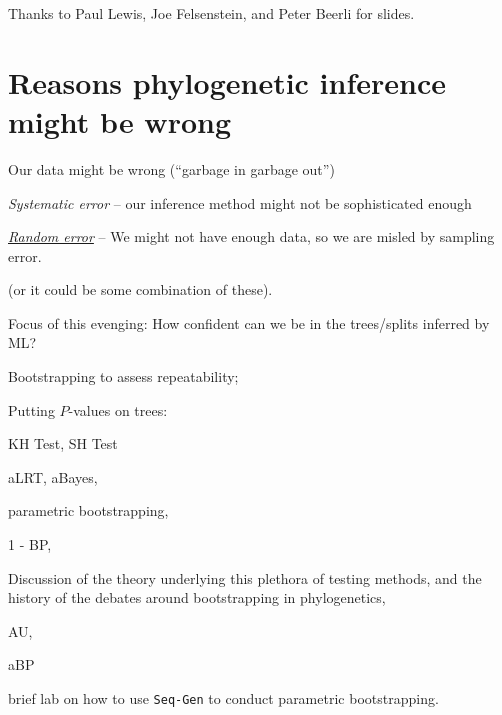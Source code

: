 \documentclass[landscape]{foils}
\begin{document}
\myNewSlide
\huge 
Thanks to Paul Lewis, Joe Felsenstein, and Peter Beerli for slides.

\myNewSlide
\section*{Reasons phylogenetic inference might be wrong}
\Large
\begin{compactenum}
	\item Our data might be wrong (``garbage in garbage out'')
	\item {\em Systematic error} -- our inference method might not be sophisticated enough
	\item \underline{{\em Random error}} -- We might not have enough data, so we are misled by sampling error.
\end{compactenum}

(or it could be some combination of these).

{Focus of this evenging: How confident can we be in the trees/splits inferred by ML?}

\myNewSlide
\begin{compactenum}
	\item Bootstrapping to assess repeatability;
	\item Putting $P$-values on trees:
	\begin{compactitem}
		\item KH Test, SH Test
		\item aLRT, aBayes,
		\item parametric bootstrapping,
		\item 1 - BP,
		\item Discussion of the theory underlying this plethora of testing methods, and the history of the debates around bootstrapping in phylogenetics,
		\item AU,
		\item aBP
	\end{compactitem}
	\item brief lab on how to use {\tt Seq-Gen} to conduct parametric bootstrapping.
\end{compactenum}


\myNewSlide
 

\myNewSlide
 
\end{document}
